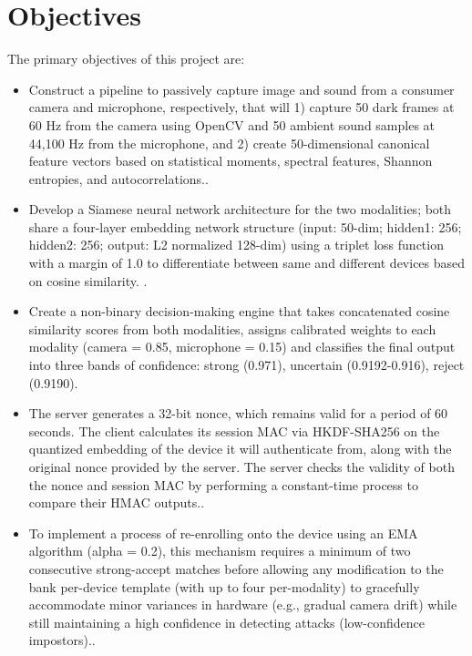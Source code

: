 
\section{Objectives}

The primary objectives of this project are:

\begin{itemize}
    \item Construct a pipeline to passively capture image and sound from a consumer camera and microphone, respectively, that will 1) capture 50 dark frames at 60 Hz from the camera using OpenCV and 50 ambient sound samples at 44,100 Hz from the microphone, and 2) create 50-dimensional canonical feature vectors based on statistical moments, spectral features, Shannon entropies, and autocorrelations.\cite{shannon1948mathematical, welch1967use}.

    \item Develop a Siamese neural network architecture for the two modalities; both share a four-layer embedding network structure (input: 50-dim; hidden1: 256; hidden2: 256; output: L2 normalized 128-dim) using a triplet loss function with a margin of 1.0 to differentiate between same and different devices based on cosine similarity. \cite{bromley1993signature, schroff2015facenet}.

    \item Create a non-binary decision-making engine that takes concatenated cosine similarity scores from both modalities, assigns calibrated weights to each modality (camera = 0.85, microphone = 0.15) and classifies the final output into three bands of confidence: strong (0.971), uncertain (0.9192-0.916), reject (0.9190).

    \item The server generates a 32-bit nonce, which remains valid for a period of 60 seconds. The client calculates its session MAC via HKDF-SHA256 on the quantized embedding of the device it will authenticate from, along with the original nonce provided by the server. The server checks the validity of both the nonce and session MAC by performing a constant-time process to compare their HMAC outputs.\cite{krawczyk2010hkdf}.

    \item To implement a process of re-enrolling onto the device using an EMA algorithm (alpha = 0.2), this mechanism requires a minimum of two consecutive strong-accept matches before allowing any modification to the bank per-device template (with up to four per-modality) to gracefully accommodate minor variances in hardware (e.g., gradual camera drift) while still maintaining a high confidence in detecting attacks (low-confidence impostors).\cite{mazumdar2019backdoors}.
\end{itemize}

